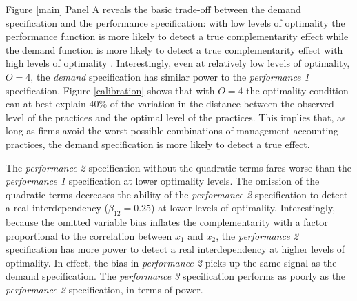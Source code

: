 \documentclass[12pt]{article}
\begin{document}
Figure \ref{main} Panel A reveals the basic trade-off between the demand specification and the performance specification: with low levels of optimality the performance function is more likely to detect a true complementarity effect while the demand function is more likely to detect a true complementarity effect with high levels of optimality \citep{grabner_management_2013, aral_three-way_2012, johansson_testing_2018}. Interestingly, even at relatively low levels of optimality, $O = 4$, the \emph{demand} specification has similar power to the \emph{performance 1} specification. Figure \ref{calibration} shows that with $O=4$ the optimality condition can at best explain $40\%$ of the variation in the distance between the observed level of the practices and the optimal level of the practices. This implies that, as long as firms avoid the worst possible combinations of management accounting practices, the demand specification is more likely to detect a true effect.

The \emph{performance 2} specification without the quadratic terms fares worse than the \emph{performance 1} specification at lower optimality levels. The omission of the quadratic terms decreases the ability of the \emph{performance 2} specification to detect a real interdependency ($\beta_{12} = 0.25$) at lower levels of optimality. Interestingly, because the omitted variable bias inflates the complementarity with a factor proportional to the correlation between $x_1$ and $x_2$, the \emph{performance 2} specification has more power to detect a real interdependency at higher levels of optimality. In effect, the bias in \emph{performance 2} picks up the same signal as the demand specification. The \emph{performance 3}  specification performs as poorly as the \emph{performance 2}  specification, in terms of power. 
\end{document}
